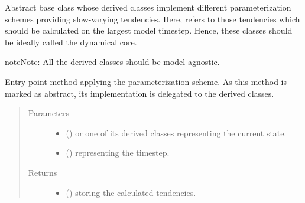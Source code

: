 \documentclass[letterpaper,10pt,english]{sphinxmanual}
\begin{document}
\begin{fulllineitems}
\label{\detokenize{api:parameterizations.slow_tendencies.SlowTendency}}
Abstract base class whose derived classes implement different parameterization schemes
providing slow-varying tendencies. Here,  refers to those tendencies which
should be calculated on the largest model timestep. Hence, these classes should be ideally
called  the dynamical core.

\begin{sphinxadmonition}{note}{Note:}
All the derived classes should be model-agnostic.
\end{sphinxadmonition}

\begin{fulllineitems}
\label{\detokenize{api:parameterizations.slow_tendencies.SlowTendency.__call__}}
Entry-point method applying the parameterization scheme.
As this method is marked as abstract, its implementation is delegated to the derived classes.
\begin{quote}\begin{description}
\item[{Parameters}] \leavevmode\begin{itemize}
\item {} 
 () \textendash{}  or one of its derived classes representing the current state.

\item {} 
 () \textendash{}  representing the timestep.

\end{itemize}

\item[{Returns}] \leavevmode
\begin{itemize}
\item {} 
 () \textendash{} {\hyperref[\detokenize{api:storages.grid_data.GridData}]{}} storing the calculated tendencies.


\end{itemize}
\end{description}
\end{quote}
\end{fulllineitems}
\end{fulllineitems}
\end{document}
